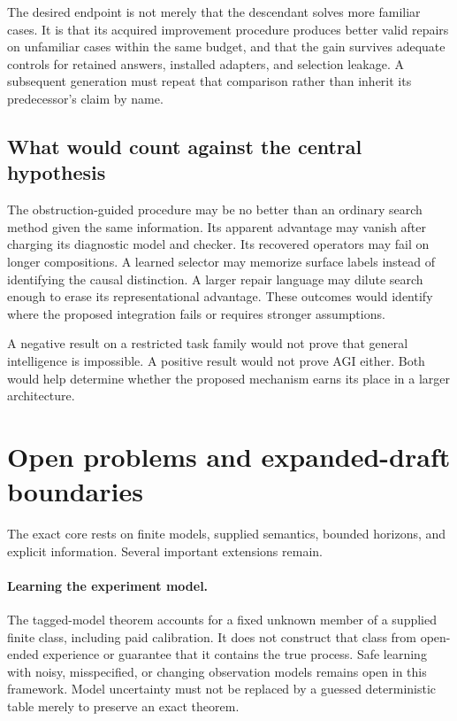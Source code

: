 \documentclass[11pt,letterpaper]{article}
\theoremstyle{plain}
\theoremstyle{definition}
\begin{document}
The desired endpoint is not merely that the descendant solves more familiar cases. It is that its acquired improvement procedure produces better valid repairs on unfamiliar cases within the same budget, and that the gain survives adequate controls for retained answers, installed adapters, and selection leakage. A subsequent generation must repeat that comparison rather than inherit its predecessor's claim by name.

\subsection{What would count against the central hypothesis}
The obstruction-guided procedure may be no better than an ordinary search method given the same information. Its apparent advantage may vanish after charging its diagnostic model and checker. Its recovered operators may fail on longer compositions. A learned selector may memorize surface labels instead of identifying the causal distinction. A larger repair language may dilute search enough to erase its representational advantage. These outcomes would identify where the proposed integration fails or requires stronger assumptions.

A negative result on a restricted task family would not prove that general intelligence is impossible. A positive result would not prove AGI either. Both would help determine whether the proposed mechanism earns its place in a larger architecture.

\section{Open problems and expanded-draft boundaries}\label{sec:limits}
The exact core rests on finite models, supplied semantics, bounded horizons, and explicit information. Several important extensions remain.

\paragraph{Learning the experiment model.}
The tagged-model theorem accounts for a fixed unknown member of a supplied finite class, including paid calibration. It does not construct that class from open-ended experience or guarantee that it contains the true process. Safe learning with noisy, misspecified, or changing observation models remains open in this framework. Model uncertainty must not be replaced by a guessed deterministic table merely to preserve an exact theorem.
\end{document}
